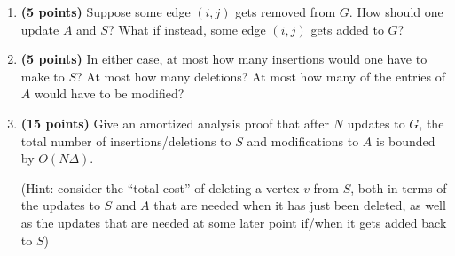 \documentclass[11pt]{article}
\begin{document}
\begin{enumerate}
{\begin{enumerate}[resume]
    \item {\bf (5 points)} Suppose some edge $(i,j)$ gets removed from $G$. How should one update $A$ and $S$? What if instead, some edge $(i,j)$ gets added to $G$?
    \item {\bf (5 points)} In either case, at most how many insertions would one have to make to $S$? At most how many deletions? At most how many of the entries of $A$ would have to be modified?
    \item {\bf (15 points)} Give an amortized analysis proof that after $N$ updates to $G$, the total number of insertions/deletions to $S$ and modifications to $A$ is bounded by $O(N\Delta)$. 
    
    (Hint: consider the ``total cost'' of deleting a vertex $v$ from $S$, both in terms of the updates to $S$ and $A$ that are needed when it has just been deleted, as well as the updates that are needed at some later point if/when it gets added back to $S$)
\end{enumerate}
}\fi 




\end{enumerate}
\end{document}
